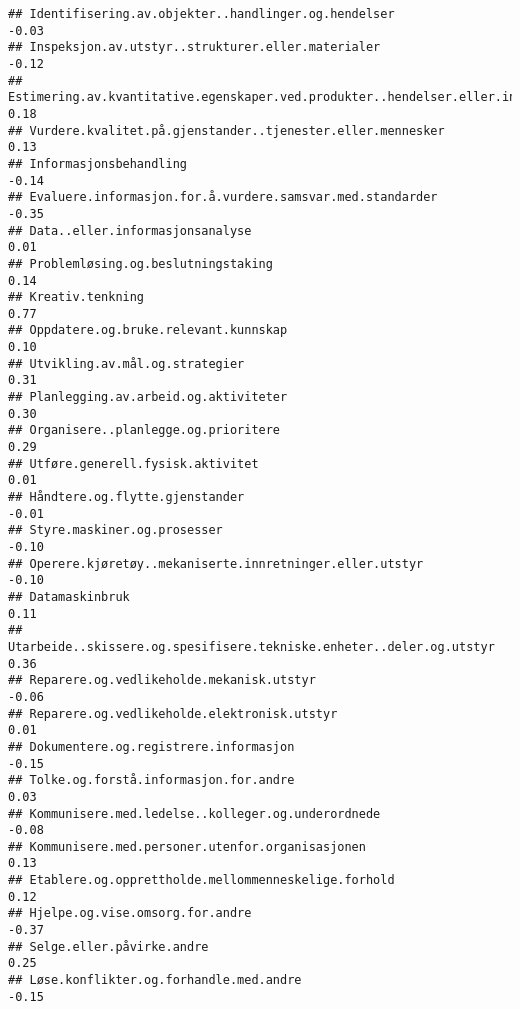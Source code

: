 \documentclass[
]{article}
\begin{document}
\begin{verbatim}
## Identifisering.av.objekter..handlinger.og.hendelser                              -0.03
## Inspeksjon.av.utstyr..strukturer.eller.materialer                                -0.12
## Estimering.av.kvantitative.egenskaper.ved.produkter..hendelser.eller.informasjon  0.18
## Vurdere.kvalitet.på.gjenstander..tjenester.eller.mennesker                        0.13
## Informasjonsbehandling                                                           -0.14
## Evaluere.informasjon.for.å.vurdere.samsvar.med.standarder                        -0.35
## Data..eller.informasjonsanalyse                                                   0.01
## Problemløsing.og.beslutningstaking                                                0.14
## Kreativ.tenkning                                                                  0.77
## Oppdatere.og.bruke.relevant.kunnskap                                              0.10
## Utvikling.av.mål.og.strategier                                                    0.31
## Planlegging.av.arbeid.og.aktiviteter                                              0.30
## Organisere..planlegge.og.prioritere                                               0.29
## Utføre.generell.fysisk.aktivitet                                                  0.01
## Håndtere.og.flytte.gjenstander                                                   -0.01
## Styre.maskiner.og.prosesser                                                      -0.10
## Operere.kjøretøy..mekaniserte.innretninger.eller.utstyr                          -0.10
## Datamaskinbruk                                                                    0.11
## Utarbeide..skissere.og.spesifisere.tekniske.enheter..deler.og.utstyr              0.36
## Reparere.og.vedlikeholde.mekanisk.utstyr                                         -0.06
## Reparere.og.vedlikeholde.elektronisk.utstyr                                       0.01
## Dokumentere.og.registrere.informasjon                                            -0.15
## Tolke.og.forstå.informasjon.for.andre                                             0.03
## Kommunisere.med.ledelse..kolleger.og.underordnede                                -0.08
## Kommunisere.med.personer.utenfor.organisasjonen                                   0.13
## Etablere.og.opprettholde.mellommenneskelige.forhold                               0.12
## Hjelpe.og.vise.omsorg.for.andre                                                  -0.37
## Selge.eller.påvirke.andre                                                         0.25
## Løse.konflikter.og.forhandle.med.andre                                           -0.15

\end{verbatim}
\end{document}
